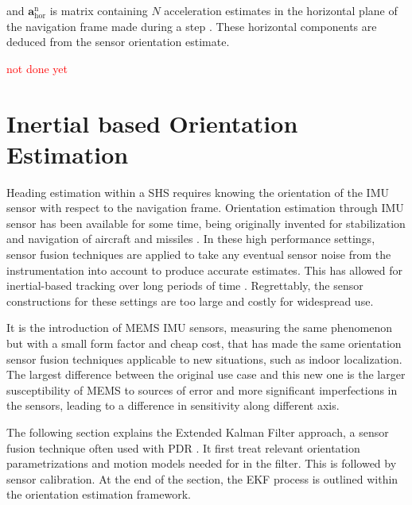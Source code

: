 and $ \mathbf{a}^\mathrm{n}_\mathrm{hor} $ is matrix containing $ N $ acceleration estimates in the horizontal plane of the navigation frame made during a step \cite{Combettes2015}. These horizontal components are deduced from the sensor orientation estimate. \par 
\textcolor{red}{not done yet}
\newpage 

\section{Inertial based Orientation Estimation}
\label{sec:rw-orientation_estimation}
Heading estimation within a \acl{SHS} requires knowing the orientation of the \ac{IMU} sensor with respect to the navigation frame. Orientation estimation through \ac{IMU} sensor has been available for some time, being originally invented for stabilization and navigation of aircraft and missiles \cite{titterton2004strapdown}. In these high performance settings, sensor fusion techniques are applied to take any eventual sensor noise from the instrumentation into account to produce accurate estimates. This has allowed for inertial-based tracking over long periods of time \cite{Harle2013}. Regrettably, the sensor constructions for these settings are too large and costly for widespread use.\par  

It is the introduction of \ac{MEMS} \ac{IMU} sensors, measuring the same phenomenon but with a small form factor and cheap cost, that has made the same orientation sensor fusion techniques applicable to new situations, such as indoor localization.  The largest difference between the original use case and this new one is the larger susceptibility of MEMS to sources of error and more significant imperfections in the sensors, leading to a difference in sensitivity along different axis. \par 

The following section explains the Extended Kalman Filter approach, a sensor fusion technique often used with PDR \cite{Michel2015a,Michel2018, Diaz2014}. It first treat relevant orientation parametrizations and motion models needed for in the filter. This is followed by sensor calibration. At the end of the section, the EKF process is outlined within the orientation estimation framework.


